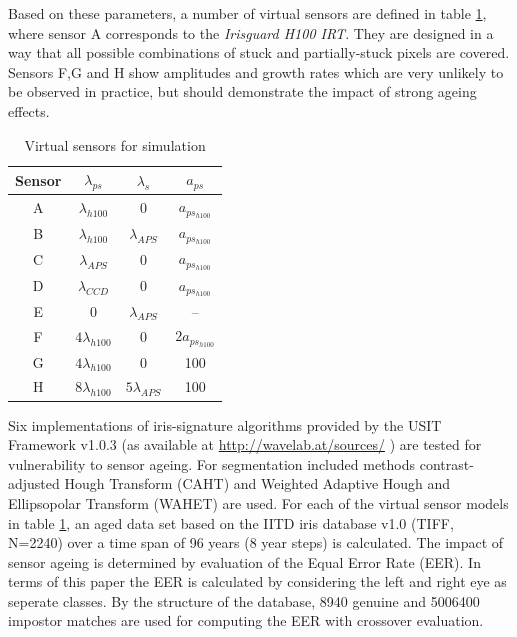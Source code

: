\documentclass[10pt,twocolumn,letterpaper]{article}
\begin{document}
\egroup

 Based on these parameters, a number of virtual sensors are defined in table \ref{table:tests}, where sensor A corresponds to the \emph{Irisguard H100 IRT}. They are designed in a way that all possible combinations of stuck and partially-stuck pixels are covered. Sensors F,G and H show amplitudes and growth rates which are very unlikely to be observed in practice, but should demonstrate the impact of strong ageing effects. 
 
 \begin{table}[bt]  
  \begin{center}
  \begin{tabular}{c | c c c }
  Sensor & $\lambda_{ps}$ & $\lambda_{s}$ & $a_{ps}$  \\
  \hline
  A	&	$\lambda_{h100}$ & 0 & $a_{ps_{h100}}$ \\
  B & $\lambda_{h100}$ & $\lambda_{APS}$ & $a_{ps_{h100}}$ \\
  C & $\lambda_{APS}$ & 0 & $a_{ps_{h100}}$    \\
  D & $\lambda_{CCD}$ & 0 & $a_{ps_{h100}}$   \\
  E & 0 & $\lambda_{APS}$ & -- \\
  F & $ 4 \lambda_{h100}$ & 0 & $ 2 a_{ps_{h100}}$ \\
  G & $ 4 \lambda_{h100}$ & 0 & 100 \\
  H & $ 8 \lambda_{h100}$ &  $ 5 \lambda_{APS}$ & 100

  \end{tabular}
    
    \vspace{3mm}
    \caption{Virtual sensors for simulation}
    \label{table:tests}
  \end{center}
 \end{table}
  
  Six implementations 
  of iris-signature algorithms provided by the USIT Framework v1.0.3 (as available at \url{http://wavelab.at/sources/} \cite{rathgeb}) are tested for vulnerability to sensor ageing. For segmentation included methods contrast-adjusted Hough Transform (CAHT) and Weighted Adaptive Hough and Ellipsopolar Transform (WAHET) are used. For each of the virtual sensor models in table \ref{table:tests}, an aged data set based on the IITD iris database v1.0 (TIFF, N=2240) \cite{IITD} over a time span of 96 years (8 year steps) is calculated. The impact of sensor ageing is determined by evaluation of the Equal Error Rate (EER). In terms of this paper the EER is calculated by considering the left and right eye as seperate classes. By the structure of the database, 8940 genuine and 5006400 impostor matches are used for computing the EER with crossover evaluation.
  
\end{document}
